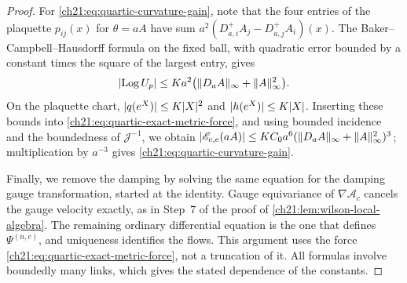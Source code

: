 \begin{proof}
For \eqref{ch21:eq:quartic-curvature-gain}, note that the four entries of the plaquette $p_{ij}(x)$ for $\theta=aA$ have sum $a^2(D_{a,i}^+A_j-D_{a,j}^+A_i)(x)$. The Baker--Campbell--Hausdorff formula on the fixed ball, with quadratic error bounded by a constant times the square of the largest entry, gives
\[
 \lvert \operatorname{Log} U_p\rvert\le Ka^2\bigl(\lVert D_aA\rVert_\infty+\lVert A\rVert_\infty^2\bigr).
\]
On the plaquette chart, $\lvert q(e^X)\rvert\le K\lvert X\rvert^2$ and $\lvert h(e^X)\rvert\le K\lvert X\rvert$. Inserting these bounds into \eqref{ch21:eq:quartic-exact-metric-force}, and using bounded incidence and the boundedness of $\mathcal J^{-1}$, we obtain $\lvert \mathscr E_{c,e}(aA)\rvert\le KC_0a^6(\lVert D_aA\rVert_\infty+\lVert A\rVert_\infty^2)^3$; multiplication by $a^{-3}$ gives \eqref{ch21:eq:quartic-curvature-gain}.

Finally, we remove the damping by solving the same equation for the damping gauge transformation, started at the identity. Gauge equivariance of $\nabla\mathcal A_c$ cancels the gauge velocity exactly, as in Step~7 of the proof of \cref{ch21:lem:wilson-local-algebra}. The remaining ordinary differential equation is the one that defines $\Psi^{(n,c)}$, and uniqueness identifies the flows. This argument uses the force \eqref{ch21:eq:quartic-exact-metric-force}, not a truncation of it. All formulas involve boundedly many links, which gives the stated dependence of the constants.
\end{proof}

